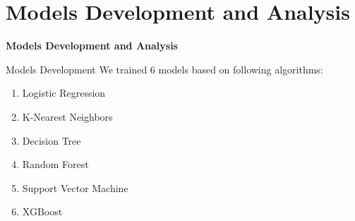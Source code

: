 \documentclass[14pt, aspectratio=169]{beamer}
\begin{document}
\section{Models Development and Analysis}
\begin{frame}{}
  \Huge
  \centering
  \textbf{Models Development and Analysis}
  \normalsize
\end{frame}
\begin{frame}{Models Development}
  We trained 6 models based on following algorithms:
  \begin{enumerate}
    \setlength\itemsep{.25em}
    \item Logistic Regression
    \item K-Nearest Neighbors
    \item Decision Tree
    \item Random Forest
    \item Support Vector Machine
    \item XGBoost
  \end{enumerate}
\end{frame}
\end{document}
